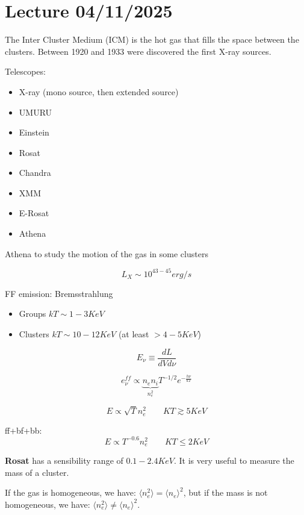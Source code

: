 \chapter{Lecture 04/11/2025}


The Inter Cluster Medium (ICM) is the hot gas that fills the space between the clusters. Between 1920 and 1933 were discovered the first X-ray sources.

Telescopes:

\begin{itemize}
    \item X-ray (mono source, then extended source)
    \item UMURU
    \item Einstein
    \item Rosat
    \item Chandra
    \item XMM
    \item E-Rosat
    \item Athena
\end{itemize}

Athena to study the motion of the gas in some clusters

$$
L_X \sim 10^{43-45} erg/s
$$

FF emission: Bremsstrahlung

\begin{itemize}
    \item Groups $kT \sim 1-3 KeV$
    \item Clusters $kT \sim 10-12 KeV$ (at least $> 4-5 KeV$)
\end{itemize}



$$
E_\nu \equiv \dfrac {dL}{dV d\nu}
$$

$$
e_\nu^{ff} \propto \underbrace{n_e n_i}_{n_e^2} T^{-1/2} e ^{-\frac{h\nu}{kT}}
$$


$$
E \propto \sqrt{T} n_e^2 \qquad KT \gtrsim 5 KeV
$$

ff+bf+bb:
$$
E \propto T^{-0.6} n_e^2 \qquad KT \le 2 KeV
$$

\textbf{Rosat} has a sensibility range of $0.1-2.4 KeV$. It is very useful to measure the mass of a cluster.

If the gas is homogeneous, we have: $\langle n_e^2 \rangle = \langle n_e \rangle^2$, but if the mass is not homogeneous, we have: $\langle n_e^2 \rangle \neq \langle n_e \rangle^2$.

